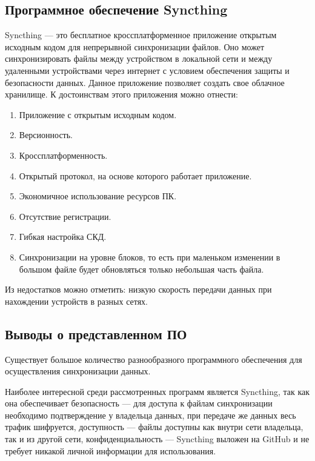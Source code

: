 \subsection{Программное обеспечение Syncthing}
Syncthing — это бесплатное кроссплатформенное приложение открытым исходным кодом для непрерывной синхронизации файлов\cite{syncthing}. Оно может синхронизировать файлы между устройством в локальной сети и между удаленными устройствами через интернет с условием обеспечения защиты и безопасности данных. Данное приложение позволяет создать свое облачное хранилище.
К достоинствам этого приложения можно отнести:
\begin{enumerate}
	\item Приложение с открытым исходным кодом.
	\item Версионность.
	\item Кроссплатформенность.
	\item Открытый протокол, на основе которого работает приложение.
	\item Экономичное использование ресурсов ПК.
	\item Отсутствие регистрации.
	\item Гибкая настройка СКД.
	\item Синхронизации на уровне блоков, то есть при маленьком изменении в большом файле будет обновляться только небольшая часть файла.
\end{enumerate}

Из недостатков можно отметить: низкую скорость передачи данных при нахождении устройств в разных сетях.

\subsection{Выводы о представленном ПО}
Существует большое количество разнообразного программного обеспечения для осуществления синхронизации данных. 

Наиболее интересной среди рассмотренных программ является Syncthing, так как она обеспечивает безопасность --- для доступа к файлам синхронизации необходимо подтверждение у владельца данных, при передаче же данных весь трафик шифруется, доступность --- файлы доступны как внутри сети владельца, так и из другой сети, конфиденциальность --- Syncthing выложен на GitHub и не требует никакой личной информации для использования.